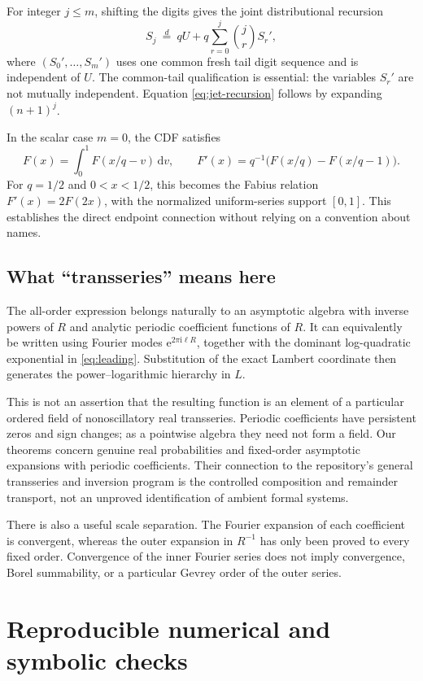 \documentclass[11pt,a4paper]{article}
\numberwithin{equation}{section}
\theoremstyle{definition}
\newcommand{\dd}{\,\mathrm d}
\newcommand{\ii}{\mathrm i}
\newcommand{\ee}{\mathrm e}
\begin{document}
For integer $j\leq m$, shifting the digits gives the joint distributional recursion
\begin{equation}
 S_j\ \overset{d}=\ qU+q\sum_{r=0}^j\binom jr S_r',
 \label{eq:jet-recursion}
\end{equation}
where $(S_0',\ldots,S_m')$ uses one common fresh tail digit sequence and is independent of $U$. The common-tail qualification is essential: the variables $S_r'$ are not mutually independent. Equation \eqref{eq:jet-recursion} follows by expanding $(n+1)^j$.

In the scalar case $m=0$, the CDF satisfies
\[
 F(x)=\int_0^1F(x/q-v)\dd v,\qquad
 F'(x)=q^{-1}\bigl(F(x/q)-F(x/q-1)\bigr).
\]
For $q=1/2$ and $0<x<1/2$, this becomes the Fabius relation
$F'(x)=2F(2x)$, with the normalized uniform-series support $[0,1]$. This establishes the direct endpoint connection without relying on a convention about names.

\subsection{What ``transseries'' means here}
The all-order expression belongs naturally to an asymptotic algebra with inverse powers of $R$ and analytic periodic coefficient functions of $R$. It can equivalently be written using Fourier modes $\ee^{2\pi\ii\ell R}$, together with the dominant log-quadratic exponential in \eqref{eq:leading}. Substitution of the exact Lambert coordinate then generates the power--logarithmic hierarchy in $L$.

This is not an assertion that the resulting function is an element of a particular ordered field of nonoscillatory real transseries. Periodic coefficients have persistent zeros and sign changes; as a pointwise algebra they need not form a field. Our theorems concern genuine real probabilities and fixed-order asymptotic expansions with periodic coefficients. Their connection to the repository's general transseries and inversion program \cite{repotrans} is the controlled composition and remainder transport, not an unproved identification of ambient formal systems.

There is also a useful scale separation. The Fourier expansion of each coefficient is convergent, whereas the outer expansion in $R^{-1}$ has only been proved to every fixed order. Convergence of the inner Fourier series does not imply convergence, Borel summability, or a particular Gevrey order of the outer series.

\section{Reproducible numerical and symbolic checks}
\label{sec:numerics}
\end{document}

